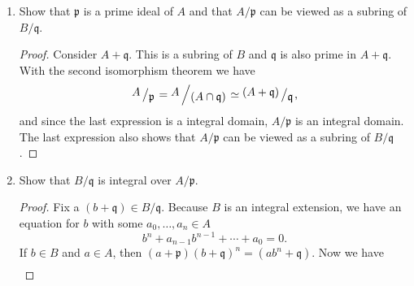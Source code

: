 \documentclass[a4paper]{article}
\newcommand{\bigslant}[2]{{\raisebox{.2em}{$#1$}\left/\raisebox{-.2em}{$#2$}\right.}}
\begin{document}
\begin{enumerate}
\begin{proof}
    For the other direction of the implication, let \(B\) be a field and fix an \(x \in A\). \(x\) is a unit in \(B\), so there is a \(y \in B\) with \(xy = 1\). Again, for \(y\) we have the expression
    \begin{align*}
      0 = a_0 + a_1 y + a_2 y^2 + \cdots + a_n y^n
    \end{align*}
    and if we multiply \(x^{n-1}\) on both sides, we yield
    \begin{align*}
      & 0 = a_0 x^{n-1} + a_1 x^{n-2} + a_2 x^{n-3} + \cdots + a_n y \\
      \iff & -a_0 x^{n-1} - a_1 x^{n-2} - a_2 x^{n-3} - \cdots - a_{n-1} =  a_n y \\
      \iff & a_n^{-1} (-a_0 x^{n-1} - a_1 x^{n-2} - a_2 x^{n-3} - \cdots - a_{n-1}) = y
    \end{align*}
    In other words, \(y\) is in \(A\) or in different words, \(A\) is a field.
  \end{proof}
  \item Show that \(\mathfrak{p}\) is a prime ideal of \(A\) and that \(A / \mathfrak{p}\) can be viewed as a subring of \(B / \mathfrak{q}\).
  \begin{proof}
    Consider \(A + \mathfrak{q}\). This is a subring of \(B\) and \(\mathfrak{q}\) is also prime in \(A + \mathfrak{q}\). With the second isomorphism theorem we have
    \begin{equation*}
      \bigslant{A}{\mathfrak{p}} = \bigslant{A}{(A \cap \mathfrak{q})} \simeq \bigslant{(A + \mathfrak{q})}{\mathfrak{q}} \text{,}
    \end{equation*}
    and since the last expression is a integral domain, \(A / \mathfrak{p}\) is an integral domain. The last expression also shows that \(A/\mathfrak{p}\) can be viewed as a subring of \(B / \mathfrak{q}\).
  \end{proof}
  \item Show that \(B / \mathfrak{q}\) is integral over \(A / \mathfrak{p}\).
  \begin{proof}
    Fix a \((b + \mathfrak{q}) \in B/\mathfrak{q}\). Because \(B\) is an integral extension, we have an equation for \(b\) with some \(a_0, \ldots, a_n \in A\)
    \begin{equation*}
      b^n + a_{n-1}b^{n-1} + \cdots + a_0 = 0\text{.}
    \end{equation*}
    If \(b \in B\) and \(a \in A\), then \((a + \mathfrak{p})(b + \mathfrak{q})^n = (ab^n + \mathfrak{q})\). Now we have
    \begin{align*}

\end{align*}
\end{proof}
\end{enumerate}
\end{document}
